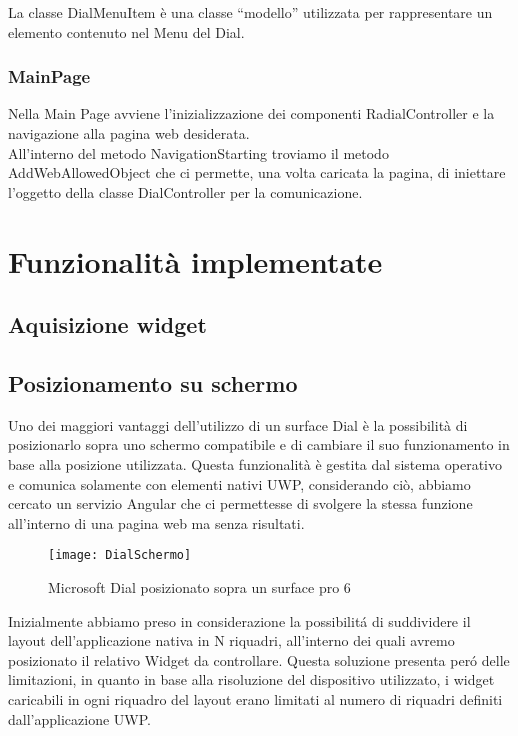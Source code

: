 La classe DialMenuItem è una classe “modello” utilizzata per rappresentare un elemento contenuto nel Menu del Dial.

\subsubsection{MainPage}

Nella Main Page avviene l’inizializzazione dei componenti RadialController e la navigazione alla pagina web desiderata.\\

All’interno del metodo NavigationStarting troviamo il metodo AddWebAllowedObject che ci permette, una volta caricata la pagina, di iniettare l’oggetto della classe DialController per la comunicazione.

\section{Funzionalità implementate}

\subsection{Aquisizione widget}
\subsection{Posizionamento su schermo}

Uno dei maggiori vantaggi dell’utilizzo di un surface Dial è la possibilità di posizionarlo sopra uno schermo compatibile e di cambiare il suo funzionamento in base alla posizione utilizzata.
Questa funzionalità è gestita dal sistema operativo e comunica solamente con elementi nativi UWP, considerando ciò, abbiamo cercato un servizio Angular che ci permettesse di svolgere la stessa funzione all’interno di una pagina web ma senza risultati.
\begin{figure}[htpb!]
  \centering
  \texttt{[image: DialSchermo]}
  \caption{Microsoft Dial posizionato sopra un surface pro 6}
\end{figure}
Inizialmente abbiamo preso in considerazione la possibilitá di suddividere il layout dell’applicazione nativa in N riquadri, all’interno dei quali avremo posizionato il relativo Widget da controllare. Questa soluzione presenta peró delle limitazioni, in quanto in base alla risoluzione del dispositivo utilizzato, i widget caricabili in ogni riquadro del layout erano limitati al numero di riquadri definiti dall’applicazione UWP.

